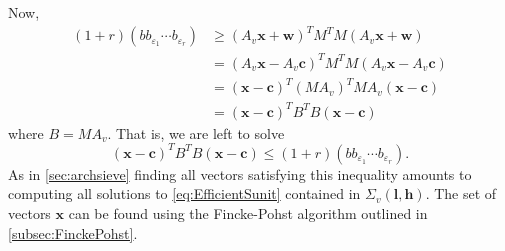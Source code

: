 Now, 
\begin{align*}
(1 + r)(bb_{\varepsilon_1}\cdots b_{\varepsilon_r})
	& \geq (A_v \mathbf{x}+\mathbf{w})^TM^TM(A_v \mathbf{x}+\mathbf{w}) \\
	& = (A_v \mathbf{x}-A_v\mathbf{c})^TM^TM(A_v \mathbf{x}-A_v\mathbf{c})\\
	& = (\mathbf{x}-\mathbf{c})^T(MA_v)^TMA_v(\mathbf{x}-\mathbf{c})\\
	& = (\mathbf{x}-\mathbf{c})^TB^TB(\mathbf{x}-\mathbf{c})
\end{align*}
where $B = MA_v$. That is, we are left to solve
\[(\mathbf{x}-\mathbf{c})^TB^TB(\mathbf{x}-\mathbf{c}) \leq (1 + r)(bb_{\varepsilon_1}\cdots b_{\varepsilon_r}).\]
As in \autoref{sec:archsieve} finding all vectors satisfying this inequality amounts to computing all solutions to \eqref{eq:EfficientSunit} contained in $\Sigma_{v}(\mathbf{l}, \mathbf{h})$. The set of vectors $\mathbf{x}$ can be found using the Fincke-Pohst algorithm outlined in \autoref{subsec:FinckePohst}. 
 

\endinput

Any text after an \endinput is ignored.
You could put scraps here or things in progress.
